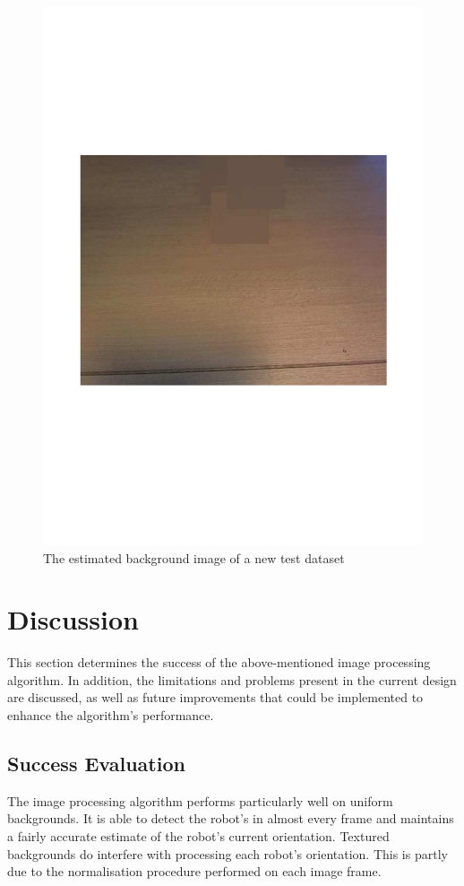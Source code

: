 \documentclass{article}
\begin{document}
\begin{figure}[h!]
\begin{minipage}[b]{0.5\linewidth}
\includegraphics[scale=0.3]{../Drawings/backdata10.pdf}
\caption{The estimated background image of a new test dataset}
\label{fig:backdata10}
\end{minipage}
\end{figure}



\section{Discussion}
\label{sec:discussion}
This section determines the success of the above-mentioned image processing algorithm. In addition, the limitations and problems present in the current design are discussed, as well as future improvements that could be implemented to enhance the algorithm's performance.

\subsection{Success Evaluation}
\label{sec:success}
The image processing algorithm performs particularly well on uniform backgrounds. It is able to detect the robot's in almost every frame and maintains a fairly accurate estimate of the robot's current orientation. Textured backgrounds do interfere with processing each robot's orientation. This is partly due to the normalisation procedure performed on each image frame.\\
\end{document}
